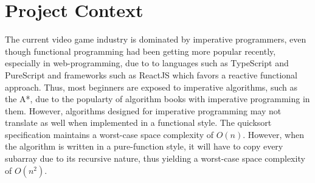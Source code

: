 






\section{Project Context}
The current video game industry is dominated by imperative programmers, even though functional programming had been 
getting more popular recently, especially in web-programming, due to to languages such as TypeScript and PureScript and 
frameworks such as ReactJS which favors a reactive functional approach. Thus, most beginners are exposed to 
imperative algorithms, such as the A*, due to the popularty of algorithm books with imperative programming in them.\cite{CLRS,Knuth1997,Skiena}
However, algorithms designed for imperative programming may not translate as well when implemented in a functional style.
The quicksort specification maintains a worst-case space complexity of $O(n)$. However, when the algorithm is written in a 
pure-function style, it will have to copy every subarray due to its recursive nature, thus yielding  a worst-case space complexity 
of $O(n^2)$. 

